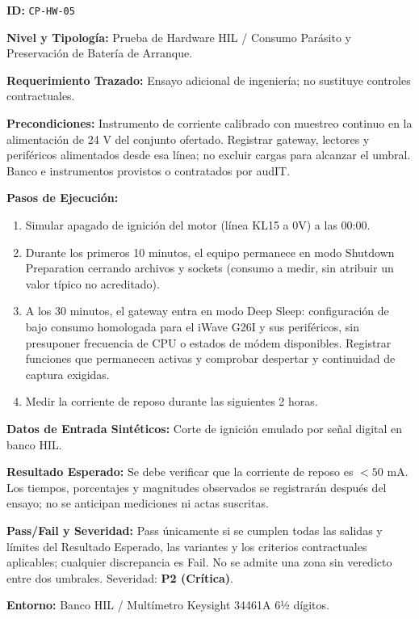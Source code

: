 \par\noindent \textbf{ID:} \texttt{CP-\allowbreak{}HW-\allowbreak{}05}\par
\par\noindent \textbf{Nivel y Tipología:} Prueba de Hardware HIL / Consumo Parásito y Preservación de Batería de Arranque.\par
\par\noindent \textbf{Requerimiento Trazado:} Ensayo adicional de ingeniería; no sustituye controles contractuales.\par
\par\noindent \textbf{Precondiciones:} Instrumento de corriente calibrado con muestreo continuo en la alimentación de 24 V del conjunto ofertado. Registrar gateway, lectores y periféricos alimentados desde esa línea; no excluir cargas para alcanzar el umbral. Banco e instrumentos provistos o contratados por audIT.\par
\par\noindent \textbf{Pasos de Ejecución:}\par
\begin{enumerate}
\item Simular apagado de ignición del motor (línea KL15 a 0V) a las 00:00.
\item Durante los primeros 10 minutos, el equipo permanece en modo Shutdown Preparation cerrando archivos y sockets (consumo a medir, sin atribuir un valor típico no acreditado).
\item A los 30 minutos, el gateway entra en modo Deep Sleep: configuración de bajo consumo homologada para el iWave G26I y sus periféricos, sin presuponer frecuencia de CPU o estados de módem disponibles. Registrar funciones que permanecen activas y comprobar despertar y continuidad de captura exigidas.
\item Medir la corriente de reposo durante las siguientes 2 horas.
\end{enumerate}

\par\noindent \textbf{Datos de Entrada Sintéticos:} Corte de ignición emulado por señal digital en banco HIL.\par
\par\noindent \textbf{Resultado Esperado:} Se debe verificar que la corriente de reposo es $< 50\text{ mA}$. Los tiempos, porcentajes y magnitudes observados se registrarán después del ensayo; no se anticipan mediciones ni actas suscritas.\par
\par\noindent \textbf{Pass/Fail y Severidad:} Pass únicamente si se cumplen todas las salidas y límites del Resultado Esperado, las variantes y los criterios contractuales aplicables; cualquier discrepancia es Fail. No se admite una zona sin veredicto entre dos umbrales. Severidad: \textbf{P2 (Crítica)}.\par
\par\noindent \textbf{Entorno:} Banco HIL / Multímetro Keysight 34461A 6½ dígitos.\par



